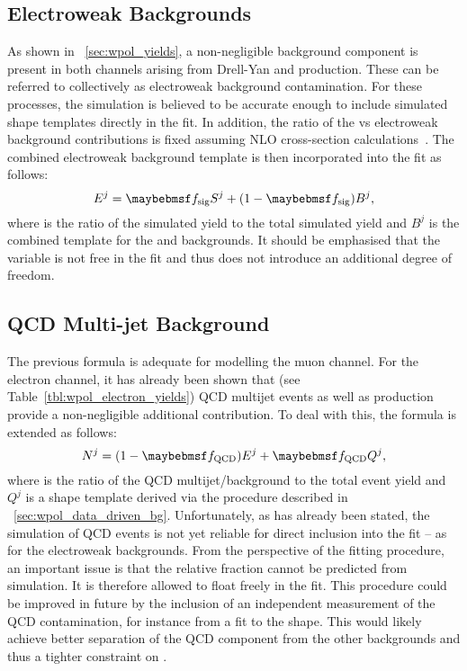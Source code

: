 \subsection{Electroweak Backgrounds}
As shown in \sec~\ref{sec:wpol_yields}, a non-negligible background component
is present in both channels arising from Drell-Yan and \ttbar production. These
can be referred to collectively as electroweak background contamination. For
these processes, the simulation is believed to be accurate enough to include
simulated \LP shape templates directly in the fit. In addition, the ratio of the
\Wjets vs electroweak background contributions is fixed assuming \ac{NLO}
cross-section
calculations~\cite{ellis_wp3jet,berger_wp4jet,heavy_quark,top_quark,drellyan}. The
combined electroweak background template is then incorporated into the fit as
follows:
\begin{equation*}
E^j = \fsig S^j + (1-\fsig) B^j,
\end{equation*}
where \fsig is the ratio of the simulated \Wjets yield to the total
simulated yield and $B^j$ is the combined \LP template for the \Zjets and \ttbar
backgrounds. It should be emphasised that the variable \fsig is not
free in the fit and thus does not introduce an additional degree of freedom.

\subsection{\ac{QCD} Multi-jet Background}
The previous formula is adequate for modelling the muon channel. For the
electron channel, it has already been shown that (see
Table~\ref{tbl:wpol_electron_yields}) \ac{QCD} multijet events as well as
\gammajets production provide a non-negligible additional contribution. To deal
with this, the formula is extended as follows:
\begin{equation*}
N^j = (1 - \fQCD) E^j + \fQCD Q^j,
\end{equation*}
where \fQCD is the ratio of the QCD multijet/\gammajets background
to the total event yield and $Q^j$ is a shape template derived via the procedure
described in \sec~\ref{sec:wpol_data_driven_bg}. Unfortunately, as has
already been stated, the simulation of QCD events is not yet reliable for direct
inclusion into the fit -- as for the electroweak backgrounds. From the
perspective of the fitting procedure, an important issue is that the relative
fraction \fQCD cannot be predicted from simulation. It is therefore
allowed to float freely in the fit. This procedure could be improved in future
by the inclusion of an independent measurement of the \ac{QCD} contamination,
for instance from a fit to the \MET shape. This would likely achieve better
separation of the \ac{QCD} component from the other backgrounds and thus a
tighter constraint on \fQCD.

